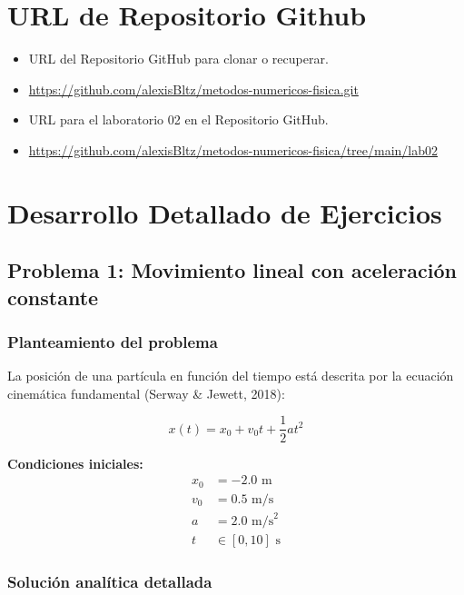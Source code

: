 \documentclass{article}
\begin{document}
	\section{URL de Repositorio Github}
	\begin{itemize}
		\item URL del Repositorio GitHub para clonar o recuperar.
		\item \url{https://github.com/alexisBltz/metodos-numericos-fisica.git}
		\item URL para el laboratorio 02 en el Repositorio GitHub.
		\item \url{https://github.com/alexisBltz/metodos-numericos-fisica/tree/main/lab02}
	\end{itemize}

	\section{Desarrollo Detallado de Ejercicios}

	\subsection{Problema 1: Movimiento lineal con aceleración constante}
	
	\subsubsection{Planteamiento del problema}
	
	La posición de una partícula en función del tiempo está descrita por la ecuación cinemática fundamental (Serway \& Jewett, 2018):
	
	\begin{equation}
		x(t) = x_0 + v_0t + \frac{1}{2}at^2
		\label{eq:cinematica}
	\end{equation}
	
	\textbf{Condiciones iniciales:}
	\begin{align}
		x_0 &= -2.0 \text{ m} \\
		v_0 &= 0.5 \text{ m/s} \\
		a &= 2.0 \text{ m/s}^2 \\
		t &\in [0, 10] \text{ s}
	\end{align}
	
	\subsubsection{Solución analítica detallada}
	
\end{document}
